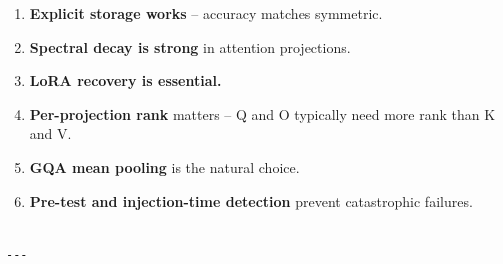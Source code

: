 \begin{enumerate}
\item \textbf{Explicit storage works} -- accuracy matches symmetric.
\item \textbf{Spectral decay is strong} in attention projections.
\item \textbf{LoRA recovery is essential.}
\item \textbf{Per-projection rank} matters -- Q and O typically need more rank than K and V.
\item \textbf{GQA mean pooling} is the natural choice.
\item \textbf{Pre-test and injection-time detection} prevent catastrophic failures.
\end{enumerate}
\begin{lstlisting}

---
\end{lstlisting}